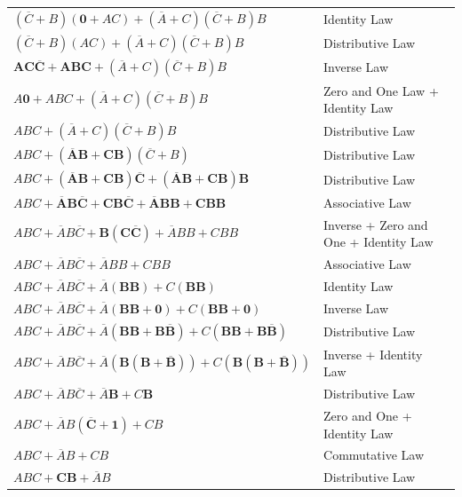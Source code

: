 \documentclass{article}
\begin{document}
\begin{enumerate}
\begin{enumerate}
\begin{tabular}{l l}
                $(\overline{C} + B)(\mathbf{0} + AC) + (\overline{A} + C)(\overline{C} + B)B$ & Identity Law \\
                $(\overline{C} + B)(AC) + (\overline{A} + C)(\overline{C} + B)B$ & Distributive Law \\
                $\mathbf{AC\overline{C} + ABC} + (\overline{A} + C)(\overline{C} + B)B$ & Inverse Law\\
                $A\mathbf{0} + ABC + (\overline{A} + C)(\overline{C} + B)B$ & Zero and One Law + Identity Law\\
                $ABC + (\overline{A} + C)(\overline{C} + B)B$ & Distributive Law\\
                $ABC + \mathbf{(\overline{A}B+CB)}(\overline{C} + B)$ & Distributive Law\\
                $ABC + \mathbf{(\overline{A}B + CB)\overline{C} + (\overline{A}B + CB)B}$ & Distributive Law\\
                $ABC + \mathbf{\overline{A}B\overline{C} + CB\overline{C} + \overline{A}BB + CBB}$ & Associative Law\\
                $ABC + \overline{A}B\overline{C} + \mathbf{B(C\overline{C})} + \overline{A}BB + CBB$ & Inverse + Zero and One + Identity Law\\
                $ABC + \overline{A}B\overline{C} + \overline{A}BB + CBB$ & Associative Law\\
                $ABC + \overline{A}B\overline{C} + \overline{A}\mathbf{(BB)} + C\mathbf{(BB)}$ & Identity Law\\
                $ABC + \overline{A}B\overline{C} + \overline{A}\mathbf{(BB + 0)} + C\mathbf{(BB + 0)}$ & Inverse Law\\
                $ABC + \overline{A}B\overline{C} + \overline{A}\mathbf{(BB + B\overline{B})} + C\mathbf{(BB + B\overline{B})}$ & Distributive Law\\
                $ABC + \overline{A}B\overline{C} + \overline{A}\mathbf{(B(B+\overline{B}))} + C\mathbf{(B(B+\overline{B}))}$ & Inverse + Identity Law\\
                $ABC + \overline{A}B\overline{C} + \overline{A}\mathbf{B} + C\mathbf{B}$ & Distributive Law\\
                $ABC + \overline{A}B(\mathbf{\overline{C} + 1}) + CB$ & Zero and One + Identity Law\\
                $ABC + \overline{A}B + CB$ & Commutative Law\\
                $ABC + \mathbf{CB} + \overline{A}B$ & Distributive Law\\

\end{tabular}
\end{enumerate}
\end{enumerate}
\end{document}
